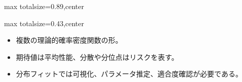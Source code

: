 \begin{minipage}[t]{0.58\textwidth}
\begin{adjustbox}{max totalsize={\textwidth}{0.89\textheight},center}
\begin{minipage}{\textwidth}
\end{minipage}
\end{adjustbox}
\end{minipage}


\clearpage
{}
\begin{minipage}[t]{0.405\textwidth}
\begin{adjustbox}{max totalsize={\textwidth}{0.43\textheight},center}
\begin{minipage}{\textwidth}\scriptsize
{}\begin{itemize}
\item 複数の理論的確率密度関数の形。
\end{itemize}\begin{itemize}
\item 期待値は平均性能、分散や分位点はリスクを表す。
\item 分布フィットでは可視化、パラメータ推定、適合度確認が必要である。
\end{itemize}
\end{minipage}
\end{adjustbox}
\end{minipage}\hfill
